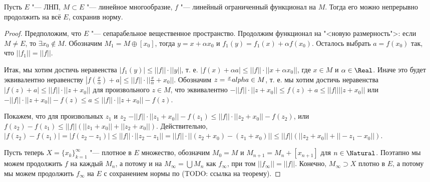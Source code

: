 \documentclass[main]{subfiles}
\begin{document}
\begin{theorem}
  Пусть $E$ "--- ЛНП, $M \subset E$ "--- линейное многообразие,
  $f$ "--- линейный ограниченный функционал на $M$. Тогда
  его можно непрерывно продолжить на всё $E$, сохранив норму.
\end{theorem}
\begin{proof}
  Предположим, что $E$ "--- сепарабельное вещественное пространство.
  Продолжим функционал на "<новую размерность">: если
  $M \ne E$, то $\exists x_0 \notin M$.
  Обозначим $M_1 = M \oplus [ x_0 ]$, тогда $y = x + \alpha x_0$
  и $f_1(y) = f_1(x) + \alpha f(x_0)$. Осталось выбрать
  $a = f(x_0)$ так, что $||f_1|| = ||f||$.
  
  Итак, мы хотим достичь неравенства $|f_1(y)| \le ||f|| \cdot ||y||$,
  т. е. $|f(x) + \alpha a| \le ||f|| \cdot ||x + \alpha x_0||$,
  где $x \in M$ и $\alpha \in \Real$. Иначе это будет эквивалентно
  неравенству $|f(\frac{x}{\alpha}) + a| \le ||f|| \cdot ||\frac{x}{\alpha} + x_0||$.
  Обозначим $z = \frac{x}\\alpha \in M$, т. е. мы хотим
  достичь неравенства $|f(z) + a| \le ||f|| \cdot ||z + x_0||$ для произвольного
  $z \in M$, что эквивалентно $-||f|| \cdot ||z + x_0|| \le f(z) + a \le ||f|| ||z + x_0||$
  или $-||f|| \cdot ||z + x_0|| - f(z) \le a \le ||f|| \cdot ||z + x_0|| - f(z)$.
  
  Покажем, что для произвольных $z_1$ и $z_2$
  $-||f|| \cdot ||z_1 + x_0|| - f(z_1) \le ||f|| \cdot ||z_2 + x_0|| - f(z_2)$,
  или $f(z_2) - f(z_1) \le ||f|| (||z_1 + x_0|| + ||z_2 + x_0||)$.
  Действительно, $|f(z_2) - f(z_1)| = |f(z_2 - z_1)| \le ||f|| \cdot ||z_2 - z_1|| =
  ||f|| \cdot ||(z_2 + x_0) - (z_1 + x_0)|| \le ||f|| (||z_2 + x_0|| + ||-z_1 - x_0||)$.

  Пусть теперь $X = \{ x_k \}_{k = 1}^\infty$ "--- плотное в $E$ множество,
  обозначим $M_0 = M$ и $M_{n + 1} = M_n + [x_{n+1}]$ для $n \in \Natural$.
  Поэтапно мы можем продолжить $f$ на каждый $M_n$, а потому и на
  $M_\infty = \bigcup M_n$ как $f_\infty$, при том $||f_\infty|| = ||f||$.
  Конечно, $M_\infty \supset X$ плотно в $E$, а потому мы можем продолжить
  $f_\infty$ на $E$ с сохранением нормы по (TODO: ссылка на теорему).
\end{proof}
\end{document}
